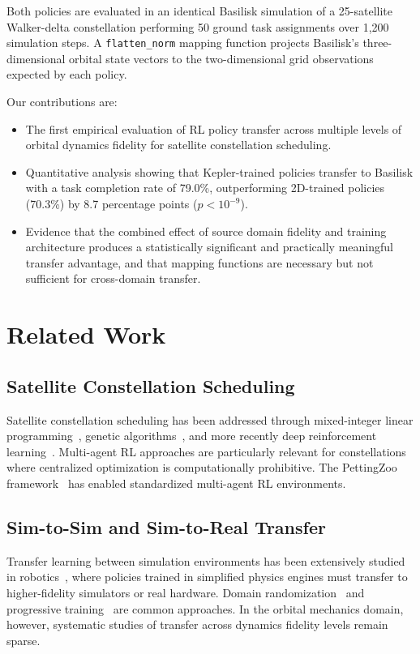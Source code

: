 \documentclass[conference]{IEEEtran}
\begin{document}
Both policies are evaluated in an identical Basilisk simulation of a 25-satellite Walker-delta constellation performing 50 ground task assignments over 1{,}200 simulation steps. A \texttt{flatten\_norm} mapping function projects Basilisk's three-dimensional orbital state vectors to the two-dimensional grid observations expected by each policy.

Our contributions are:
\begin{itemize}
    \item The first empirical evaluation of RL policy transfer across multiple levels of orbital dynamics fidelity for satellite constellation scheduling.
    \item Quantitative analysis showing that Kepler-trained policies transfer to Basilisk with a task completion rate of 79.0\%, outperforming 2D-trained policies (70.3\%) by 8.7 percentage points ($p < 10^{-9}$).
    \item Evidence that the combined effect of source domain fidelity and training architecture produces a statistically significant and practically meaningful transfer advantage, and that mapping functions are necessary but not sufficient for cross-domain transfer.
\end{itemize}


\section{Related Work}
\label{sec:related}

\subsection{Satellite Constellation Scheduling}
Satellite constellation scheduling has been addressed through mixed-integer linear programming~\cite{wang2019task}, genetic algorithms~\cite{wu2017satellite}, and more recently deep reinforcement learning~\cite{hu2024satellite}. Multi-agent RL approaches are particularly relevant for constellations where centralized optimization is computationally prohibitive. The PettingZoo framework~\cite{terry2021pettingzoo} has enabled standardized multi-agent RL environments.

\subsection{Sim-to-Sim and Sim-to-Real Transfer}
Transfer learning between simulation environments has been extensively studied in robotics~\cite{zhao2020sim}, where policies trained in simplified physics engines must transfer to higher-fidelity simulators or real hardware. Domain randomization~\cite{tobin2017domain} and progressive training~\cite{rusu2016sim} are common approaches. In the orbital mechanics domain, however, systematic studies of transfer across dynamics fidelity levels remain sparse.
\end{document}
